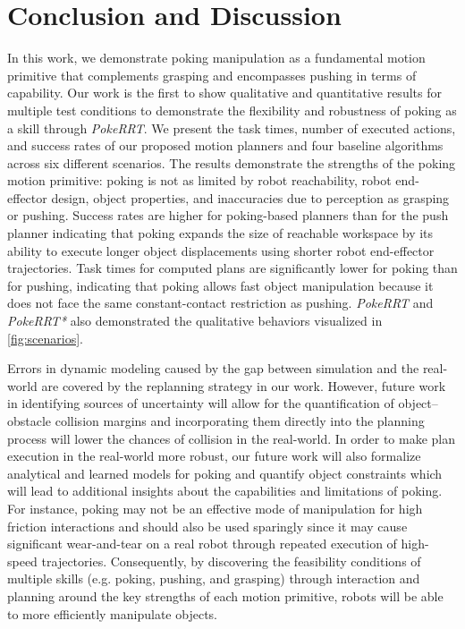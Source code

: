 \section{Conclusion and Discussion}\label{sec:discussion}

In this work, we demonstrate poking manipulation as a fundamental motion primitive that complements grasping and encompasses pushing in terms of capability. Our work is the first to show qualitative and quantitative results for multiple test conditions to demonstrate the flexibility and robustness of poking as a skill through \textsl{PokeRRT}. We present the task times, number of executed actions, and success rates of our proposed motion planners and four baseline algorithms across six different scenarios. The results demonstrate the strengths of the poking motion primitive: poking is not as limited by robot reachability, robot end-effector design, object properties, and inaccuracies due to perception as grasping or pushing. Success rates are higher for poking-based planners than for the push planner indicating that poking expands the size of reachable workspace by its ability to execute longer object displacements using shorter robot end-effector trajectories. Task times for computed plans are significantly lower for poking than for pushing, indicating that poking allows fast object manipulation because it does not face the same constant-contact restriction as pushing. \textsl{PokeRRT} and \textsl{PokeRRT*} also demonstrated the qualitative behaviors visualized in \cref{fig:scenarios}.

Errors in dynamic modeling caused by the gap between simulation and the real-world are covered by the replanning strategy in our work. However, future work in identifying sources of uncertainty will allow for the quantification of object--obstacle collision margins and incorporating them directly into the planning process will lower the chances of collision in the real-world. In order to make plan execution in the real-world more robust, our future work will also formalize analytical and learned models for poking and quantify object constraints which will lead to additional insights about the capabilities and limitations of poking. For instance, poking may not be an effective mode of manipulation for high friction interactions and should also be used sparingly since it may cause significant wear-and-tear on a real robot through repeated execution of high-speed trajectories. Consequently, by discovering the feasibility conditions of multiple skills (e.g. poking, pushing, and grasping) through interaction and planning around the key strengths of each motion primitive, robots will be able to more efficiently manipulate objects. 
\vspace{-2pt}
